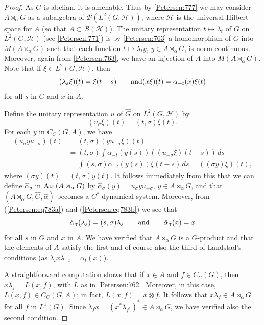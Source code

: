 \documentclass{book}
\begin{document}
\begin{proof}
  As \(G\) is abelian, it is amenable. Thus by \ref{Petersen:777} we may consider
  \(A\rtimes_{\alpha} G\) as a subalgebra of \(\mathcal{B}(L^2(G,\mathcal{H}))\),
  where \(\mathcal{H}\) is the universal Hilbert space for \(A\) (so that \(A\subset \mathcal{B}(\mathcal{H})\)).
  The unitary representation \(t\mapsto \lambda_t\) of \(G\) on \(L^2(G,\mathcal{H})\)
  (see \ref{Petersen:771}) is by \ref{Petersen:763} a homomorphism of \(G\) into \(M(A\rtimes_\alpha G)\)
  such that each function \(t\mapsto\lambda_t y\), \(y\in A\rtimes_\alpha G\), is norm continuous. Moreover,
  again from \ref{Petersen:763}, we have an injection of \(A\) into \(M(A\rtimes_\alpha G)\).
  Note that if \(\xi\in L^2(G,\mathcal{H})\), then
  \begin{equation}\label{Petersen:eq783a}
    (\lambda_s\xi)(t)=\xi(t-s)\qquad\textnormal{and}(x\xi)(t)=\alpha_{-t}(x)\xi(t)
  \end{equation}
  for all \(s\) in \(G\) and \(x\) in \(A\).\par
  Define the unitary representation \(u\) of \(\hat{G}\) on \(L^2(G,\mathcal{H})\) by
  \begin{equation}\label{Petersen:eq783b}
    (u_\sigma\xi)(t)=(t,\sigma)\xi(t).
  \end{equation}
  For each \(y\) in \(C_C(G,A)\), we have
  \begin{align*}
    (u_\sigma y u_{-\sigma})(t)&=(t,\sigma)(y u_{-\sigma}\xi)(t)\\
    &=(t,\sigma)\int \alpha_{-t}(y(s))((u_{-\sigma}\xi)(t-s))\,ds\\
    &=\int(s,\sigma)\alpha_{-t}(y(s))\xi(t-s)\,ds=((\sigma y)\xi)(t),
  \end{align*}
  where \((\sigma y)(t)=(t,\sigma)y(t)\). It follows immediately from this that we can
  define \(\hat{\alpha}_\sigma\) in \(\textnormal{Aut}(A\rtimes_\alpha G)\) by \(\hat{\alpha}_\sigma(y)=u_\sigma y u_{-\sigma}\),
  \(y\in A\rtimes_\alpha G\), and that \((A\rtimes_\alpha G,\hat{G},\hat{\alpha})\) becomes a \(C^*\)-dynamical system. Moreover, from 
  (\ref{Petersen:eq783a}) and (\ref{Petersen:eq783b}) we see that
  \[
    \hat{\alpha}_\sigma(\lambda_s)=(s,\sigma)\lambda_s\qquad\textnormal{and}\qquad\hat{\alpha}_\sigma(x)=x
  \]
  for all \(s\) in \(G\) and \(x\) in \(A\). We have verified that \(A\rtimes_\alpha G\) is a \(G\)-product
  and that the elements of \(A\) satisfy the first and of course also the third of Landstad's conditions (as \(\lambda_t x\lambda_{-t}=\alpha_t(x)\)).\par
  A straightforward computation shows that if \(x\in A\) and \(f\in C_C(G)\), then
  \(x\lambda_f=L(x,f)\), with \(L\) as in \ref{Petersen:762}. Moreover, in this case, \(L(x,f)\in C_C(G,A)\);
  in fact, \(L(x,f)=x\otimes f\). It follows that \(x\lambda_f\in A\rtimes_\alpha G\)
  for all \(f\) in \(L^1(G)\). Since \(\lambda_f x={(x^*\lambda_{f^*})}^*\in A\rtimes_\alpha G\), we have verified also the second condition. 
\end{proof}
\end{document}
